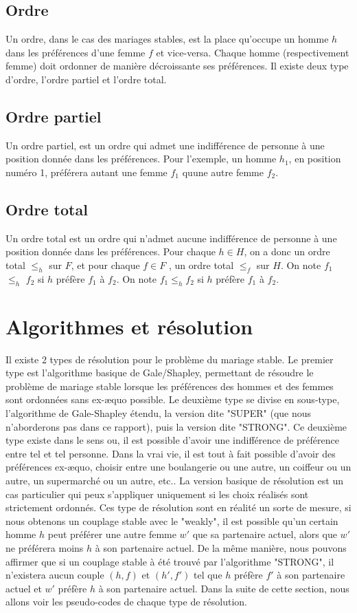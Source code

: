 \documentclass[11pt]{article}
\begin{document}
\subsection{Ordre}
Un ordre, dans le cas des mariages stables, est la place qu'occupe un homme $h$ dans les préférences d'une femme $f$ et vice-versa. Chaque homme (respectivement femme) doit ordonner de manière décroissante ses préférences. Il existe deux type d'ordre, l'ordre partiel et l'ordre total.

\subsection{Ordre partiel}
Un ordre partiel, est un ordre qui admet une indifférence de personne à une position donnée dans les préférences. Pour l'exemple, un homme $h_1$, en position numéro 1, préférera autant une femme $f_1$ quune autre femme $f_2$.


\subsection{Ordre total}
Un ordre total est un ordre qui n'admet aucune indifférence de personne à une position donnée dans les préférences.
Pour chaque $h \in H$, on a donc un ordre total $\leq_h$ sur $F$, et pour
chaque $f \in F$ , un ordre total $\leq_f$ sur $H$.
On note $f_1$ $\leq_h$ $f_2$ si $h$ préfère $f_1$ à $f_2$.
On note $f_1 \leq_h f_2$ si $h$ préfère $f_1$ à $f_2$.

\section{Algorithmes et résolution}
Il existe 2 types de résolution pour le problème du mariage stable.
Le premier type est l'algorithme basique de Gale/Shapley, permettant de résoudre le problème de mariage stable lorsque les préférences des hommes et des femmes sont ordonnées sans ex-æquo possible. Le deuxième type se divise en sous-type, l'algorithme de Gale-Shapley étendu, la version dite "SUPER" (que nous n'aborderons pas dans ce rapport), puis la version dite "STRONG". Ce deuxième type existe dans le sens ou, il est possible d'avoir une indifférence de préférence entre tel et tel personne. Dans la vrai vie, il est tout à fait possible d'avoir des préférences ex-æquo, choisir entre une boulangerie ou une autre, un coiffeur ou un autre, un supermarché ou un autre, etc.. La version basique de résolution est un cas particulier qui peux s'appliquer uniquement si les choix réalisés sont strictement ordonnés. Ces type de résolution sont en réalité un sorte de mesure, si nous obtenons un couplage stable avec le "weakly", il est possible qu'un certain homme $h$ peut préférer une autre femme $w'$ que sa partenaire actuel, alors que $w'$ ne préférera moins $h$ à son partenaire actuel. De la même manière, nous pouvons affirmer que si un couplage stable à été trouvé par l'algorithme "STRONG", il n'existera aucun couple $(h, f)$ et $(h', f')$ tel que  $h$ préfère $f'$ à son partenaire actuel et $w'$ préfère $h$ à son partenaire actuel. Dans la suite de cette section, nous allons voir les pseudo-codes de chaque type de résolution.
\newpage
\end{document}
